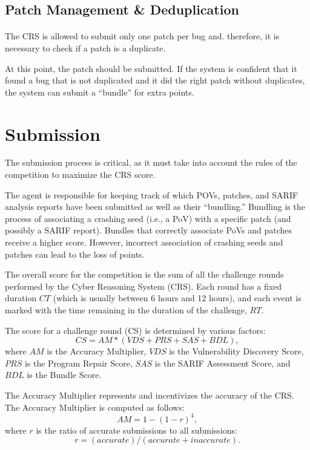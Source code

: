 \subsection{Patch Management \& Deduplication}

\paragraph{\patcherg}

The CRS is allowed to submit only one patch per bug and. therefore, it is necessary to check if a patch is a duplicate.

At this point, the patch should be submitted.
If the system is confident that it found a bug that is not duplicated and it did the right patch without duplicates, the system can submit a ``bundle'' for extra points.

\section{Submission}

The submission process is critical, as it must take into account the rules of the competition to maximize the CRS score.

The \patcherg agent is responsible for keeping track of which POVs, patches, and SARIF analysis reports have been submitted as well as their ``bundling.''
Bundling is the process of associating a crashing seed (i.e., a PoV) with a specific patch (and possibly a SARIF report).
Bundles that correctly associate PoVs and patches receive a higher score.
However, incorrect association of crashing seeds and patches can lead to the loss of points.

The overall score for the competition is the sum of all the challenge rounds performed by the Cyber Reasoning System (CRS).
Each round has a fixed duration $CT$ (which is usually between 6 hours and 12 hours), and each event is marked with the time remaining in the duration of the challenge, $RT$.

The score for a challenge round (CS) is determined by various factors:
\begin{equation}
CS = AM * (VDS + PRS + SAS + BDL),
\end{equation}
where $AM$ is the Accuracy Multiplier, $VDS$ is the Vulnerability Discovery Score, $PRS$ is the Program Repair Score, $SAS$ is the SARIF Assessment Score, and $BDL$ is the Bundle Score.

The Accuracy Multiplier represents and incentivizes the accuracy of the CRS. The Accuracy Multiplier is computed as follows:
\begin{equation}
AM = 1 - (1 - r)^4,
\end{equation}
where $r$ is the ratio of accurate submissions to all submissions:
\begin{equation}
r = (accurate)/(accurate + inaccurate).
\end{equation}


